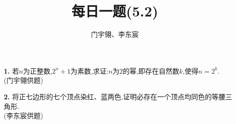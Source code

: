 \documentclass[UTF8]{ctexart}
\title{每日一题(5.2)}
\author{门宇翎、李东宸}
\begin{document}
\maketitle
\begin{itemize}
\item[\textbf{1.}]若$n$为正整数,$2^n+1$为素数,求证:$n$为2的幂,即存在自然数$k$,使得$n=2^k$.\\
{(门宇翎供题)}\\
\item[\textbf{2.}]将正七边形的七个顶点染红、蓝两色,证明必存在一个顶点均同色的等腰三角形.\\
{(李东宸供题)}

\end{itemize}
\end{document}
